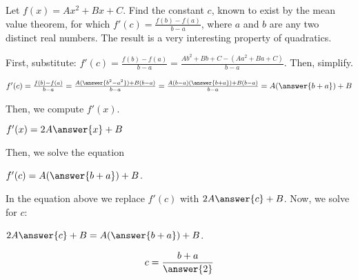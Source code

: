 \documentclass{ximera}
\author{Steven Gubkin\and Nela Lakos}
\begin{document}
\begin{exercise}

Let $f(x) = Ax^2+Bx+C$.  Find the constant $c$, known to exist by the mean value theorem, for which $f'(c) = \frac{f(b)-f(a)}{b-a}$, where $a$ and $b$ are any two distinct real numbers.  The result is a very interesting property of quadratics.
\begin{hint}
First, substitute: $f'(c) = \frac{f(b)-f(a)}{b-a}=\frac{Ab^2+Bb+C-(Aa^2+Ba+C)}{b-a}$.
Then, simplify.
\end{hint}
\begin{hint}
$f'(c) = \frac{f(b)-f(a)}{b-a}=\frac{A(\answer{b^2-a^2})+B(b-a)}{b-a}=\frac{A(b-a)(\answer{b+a})+B(b-a)}{b-a}=A(\answer{b+a})+B$
\end{hint}
\begin{hint}
Then, we compute $f'(x)$.

$f'(x) =2A\answer{x}+B $
\end{hint}
\begin{hint}
Then, we solve the equation

$f'(c) =A(\answer{b+a})+B$.
\end{hint}
\begin{hint}
In the equation above we replace $f'(c)$ with $2A\answer{c}+B $. Now, we solve for $c$:

$2A\answer{c}+B =A(\answer{b+a})+B$.
\end{hint}
\begin{prompt}
	$$c = \frac{b+a}{\answer{2}}$$
\end{prompt}

\end{exercise}
\end{document}
